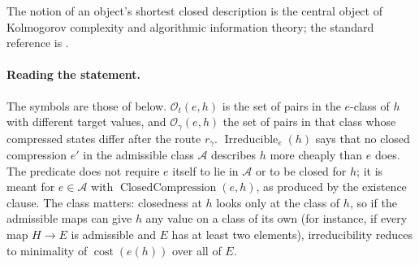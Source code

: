 The notion of an object's shortest closed description is the central
object of Kolmogorov complexity and algorithmic information theory;
the standard reference is \citet{LiVitanyi2008Kolmogorov}.

\paragraph{Reading the statement.} The symbols are those of  below.
\(\mathcal O_t(e,h)\) is the set of pairs in the \(e\)-class of \(h\)
with different target values, and \(\mathcal O_\gamma(e,h)\) the set of
pairs in that class whose compressed states differ after the route
\(r_\gamma\). \(\operatorname{Irreducible}_e(h)\) says that no closed
compression \(e'\) in the admissible class \(\mathcal A\) describes \(h\) more
cheaply than \(e\) does. The predicate does not require \(e\) itself to lie in
\(\mathcal A\) or to be closed for \(h\); it is meant for \(e\in\mathcal A\) with
\(\operatorname{ClosedCompression}(e,h)\), as produced by the existence clause. The class matters: closedness at \(h\) looks only at
the class of \(h\), so if the admissible maps can give \(h\) any value on a
class of its own (for instance, if every map \(H\to E\) is admissible and
\(E\) has at least two elements), irreducibility reduces to minimality of \(\operatorname{cost}(e(h))\) over all of \(E\).

